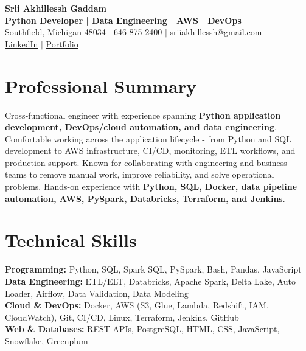 \documentclass[letterpaper,10pt]{article}
\begin{document}
\fontsize{9.35pt}{10.45pt}\selectfont

\begin{center}
    {\LARGE \textbf{Srii Akhillessh Gaddam}} \\[-1pt]
    \textbf{Python Developer | Data Engineering | AWS | DevOps} \\[2pt]
    Southfield, Michigan 48034 $|$
    \href{tel:6468752400}{646-875-2400} $|$
    \href{mailto:sriiakhillessh@gmail.com}{sriiakhillessh@gmail.com} \\[1pt]
    \href{https://www.linkedin.com/in/srii-akhiilessh-gaddam-b48668191/}{LinkedIn} $|$
    \href{https://sriiakhillesshg.github.io/portfolio/}{Portfolio}
\end{center}
\vspace{-8pt}

\section{Professional Summary}
\small{Cross-functional engineer with experience spanning \textbf{Python application development, DevOps/cloud automation, and data engineering}. Comfortable working across the application lifecycle - from Python and SQL development to AWS infrastructure, CI/CD, monitoring, ETL workflows, and production support. Known for collaborating with engineering and business teams to remove manual work, improve reliability, and solve operational problems. Hands-on experience with \textbf{Python, SQL, Docker, data pipeline automation, AWS, PySpark, Databricks, Terraform, and Jenkins}.}

\section{Technical Skills}
\small{
\textbf{Programming:} Python, SQL, Spark SQL, PySpark, Bash, Pandas, JavaScript \\
\textbf{Data Engineering:} ETL/ELT, Databricks, Apache Spark, Delta Lake, Auto Loader, Airflow, Data Validation, Data Modeling \\
\textbf{Cloud \& DevOps:} Docker, AWS (S3, Glue, Lambda, Redshift, IAM, CloudWatch), Git, CI/CD, Linux, Terraform, Jenkins, GitHub \\
\textbf{Web \& Databases:} REST APIs, PostgreSQL, HTML, CSS, JavaScript, Snowflake, Greenplum
}
\end{document}
